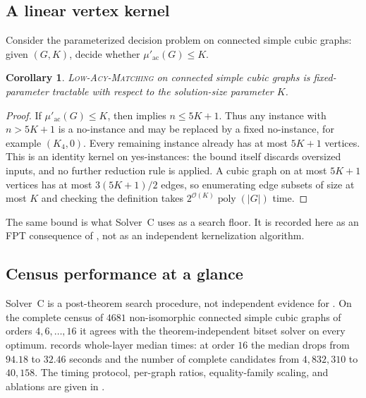 \documentclass[smallextended,natbib,nospthms]{svjour3}
\newtheorem{corollary}[corollary]{Corollary}
\theoremstyle{definition}
\theoremstyle{remark}
\newcommand{\acnum}{\mu'_{\mathrm{ac}}}
\newcommand{\LowAcy}{\textnormal{\textsc{Low-Acy-Matching}}}
\newcommand{\bigO}{\mathcal{O}}
\begin{document}
\subsection{A linear vertex kernel}

Consider the parameterized decision problem on connected simple cubic graphs:
given $(G,K)$, decide whether $\acnum(G)\leq K$.

\begin{corollary}
\label{cor:kernel}
\LowAcy{} on connected simple cubic graphs is fixed-parameter tractable with
respect to the solution-size parameter $K$.
\end{corollary}

\begin{proof}
If $\acnum(G)\leq K$, then  implies $n\leq 5K+1$.
Thus any instance with $n>5K+1$ is a no-instance and may be replaced by a
fixed no-instance, for example $(K_4,0)$. Every remaining instance already
has at most $5K+1$ vertices. This is an identity kernel on yes-instances: the
bound itself discards oversized inputs, and no further reduction rule is
applied. A cubic graph on at most $5K+1$ vertices has at most
$3(5K+1)/2$ edges, so enumerating edge subsets of size at most $K$ and
checking the definition takes $2^{\bigO(K)}\operatorname{poly}(|G|)$ time.
\end{proof}

The same bound is what Solver~C uses as a search floor. It is recorded here
as an FPT consequence of , not as an independent
kernelization algorithm.

\subsection{Census performance at a glance}

Solver~C is a post-theorem search procedure, not independent evidence for
. On the complete census of $4681$ non-isomorphic
connected simple cubic graphs of orders $4,6,\ldots,16$ it agrees with the
theorem-independent bitset solver on every optimum. 
records whole-layer median times: at order $16$ the median drops from
$94.18$ to $32.46$ seconds and the number of complete candidates from
$4{,}832{,}310$ to $40{,}158$. The timing protocol, per-graph ratios,
equality-family scaling, and ablations are given in .
\end{document}
